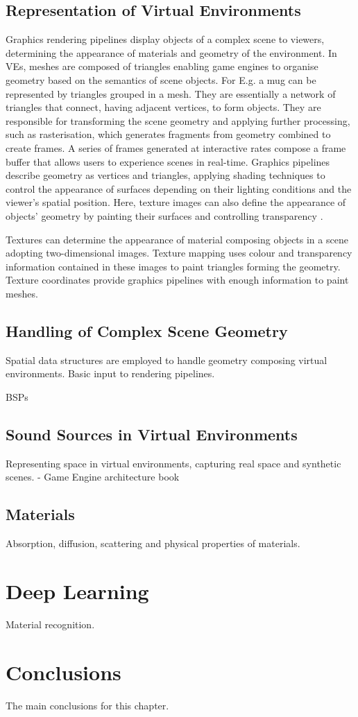 \subsection{Representation of Virtual Environments}
Graphics rendering pipelines display objects of a complex scene to viewers, determining the appearance of materials and geometry of the environment. In VEs, meshes are composed of triangles enabling game engines to organise geometry based on the semantics of scene objects. For E.g. a mug can be represented by triangles grouped in a mesh. They are essentially a network of triangles that connect, having adjacent vertices, to form objects. They are responsible for transforming the scene geometry and applying further processing, such as rasterisation, which generates fragments from geometry combined to create frames. A series of frames generated at interactive rates compose a frame buffer that allows users to experience scenes in real-time. Graphics pipelines describe geometry as vertices and triangles, applying shading techniques to control the appearance of surfaces depending on their lighting conditions and the viewer’s spatial position. Here, texture images can also define the appearance of objects' geometry by painting their surfaces and controlling transparency \citep{mcallister2002efficient, marschner2015fundamentals}.\par
Textures can determine the appearance of material composing objects in a scene adopting two-dimensional images. Texture mapping uses colour and transparency information contained in these images to paint triangles forming the geometry. Texture coordinates provide graphics pipelines with enough information to paint meshes.

\subsection{Handling of Complex Scene Geometry}\label{sec:bg-geometry-handling}
Spatial data structures are employed to handle geometry composing virtual environments. 
Basic input to rendering pipelines. 

BSPs


\subsection{Sound Sources in Virtual Environments}


Representing space in virtual environments, capturing real space and synthetic scenes.
- Game Engine architecture book                             

\subsection{Materials}
Absorption, diffusion, scattering and physical properties of materials.


\section{Deep Learning}
Material recognition.


\section{Conclusions}

The main conclusions for this chapter.


